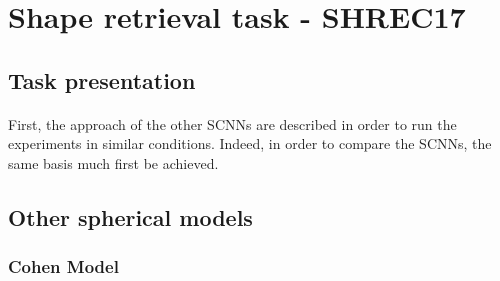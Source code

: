\documentclass[11pt]{report}
\begin{document}


\section{Shape retrieval task - SHREC17}\label{task:shrec17}
\subsection{Task presentation}
\paragraph*{}
First, the approach of the other SCNNs are described in order to run the experiments in similar conditions.
Indeed, in order to compare the SCNNs, the same basis much first be achieved.
\subsection{Other spherical models}
\subsubsection{Cohen Model}
\end{document}
